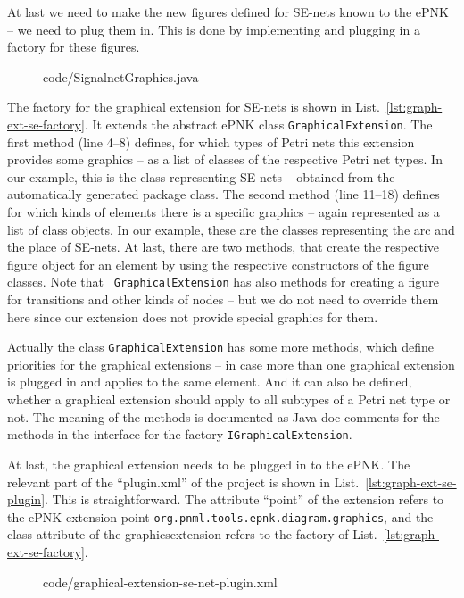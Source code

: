 At last we need to make the new figures defined for SE-nets known to
the ePNK -- we need to plug them in. This is done by implementing and
plugging in  a factory for these figures.
%
\begin{figure}[htbp!]
%
{code/SignalnetGraphics.java}
\end{figure}
%
The factory for the graphical extension for SE-nets is shown in
List.~\ref{lst:graph-ext-se-factory}. It extends the abstract ePNK
class {\tt GraphicalExtension}.%
The first method (line 4--8) defines, for which types of Petri nets this
extension provides some graphics -- as a list of classes of the respective Petri
net types. In our example, this is the class representing SE-nets -- obtained
from the automatically generated package class. The second method (line 11--18)
defines for which kinds of elements there is a specific graphics -- again
represented as a list of class objects. In our example, these are the classes
representing the arc and the place of SE-nets. At last, there are two methods,
that create the respective figure object for an element by using the
respective constructors of the figure classes. Note that {\tt
GraphicalExtension} has also methods for creating a figure for
transitions and other kinds of nodes -- but we do not need to override them
here since our extension does not provide special graphics for them.

Actually the class {\tt GraphicalExtension} has some more methods, 
which define priorities for the graphical extensions -- in case more
than one graphical extension is plugged in and applies to the same
element. And it can also be defined, whether a graphical extension should apply
to all subtypes of a Petri net type or not.  The meaning of the methods
is documented as Java doc comments for the methods in the interface for
the factory {\tt IGraphicalExtension}.%

At last, the graphical extension needs to be plugged in to the
ePNK.  The relevant part of the ``plugin.xml'' of the project is shown
in List.~\ref{lst:graph-ext-se-plugin}. This is straightforward. The
attribute ``point'' of the extension refers to the ePNK extension
point {\tt org.pnml.tools.epnk.diagram.graphics}, and the class
attribute of the graphicsextension refers to the factory of
List.~\ref{lst:graph-ext-se-factory}.  
%
\begin{figure}[htbp!]
%
{code/graphical-extension-se-net-plugin.xml}
\end{figure}

